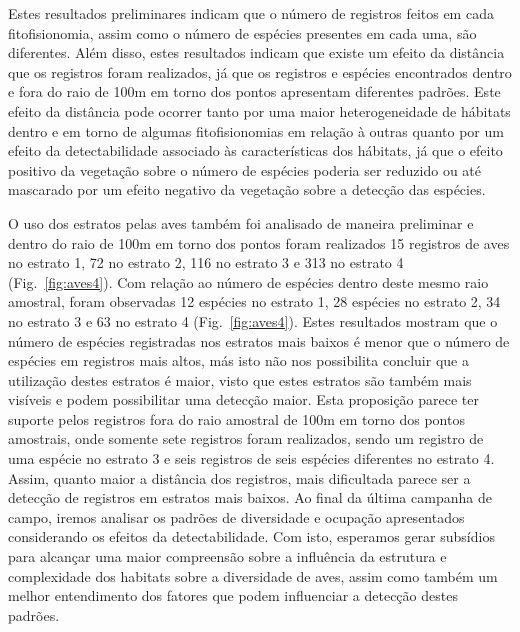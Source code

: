 Estes resultados preliminares indicam que o número de registros feitos
em cada fitofisionomia, assim como o número de espécies presentes em
cada uma, são diferentes. Além disso, estes resultados indicam que
existe um efeito da distância que os registros foram realizados, já
que os registros e espécies encontrados dentro e fora do raio de 100m
em torno dos pontos apresentam diferentes padrões. Este efeito da
distância pode ocorrer tanto por uma maior heterogeneidade de hábitats
dentro e em torno de algumas fitofisionomias em relação à outras quanto por um
efeito da detectabilidade associado às características dos hábitats,
já que o efeito positivo da vegetação sobre o número de espécies
poderia ser reduzido ou até mascarado por um efeito negativo da
vegetação sobre a detecção das espécies.

O uso dos estratos pelas aves também foi analisado de maneira
preliminar e dentro do raio de 100m em torno dos pontos foram
realizados 15 registros de aves no estrato 1, 72 no estrato 2, 116 no
estrato 3 e 313 no estrato 4 (Fig.~\ref{fig:aves4}). Com relação ao número de
espécies dentro deste mesmo raio amostral, foram observadas 12
espécies no estrato 1, 28 espécies no estrato 2, 34 no estrato 3 e 63
no estrato 4 (Fig.~\ref{fig:aves4}). Estes resultados mostram que o número de
espécies registradas nos estratos mais baixos é menor que o número de
espécies em registros mais altos, más isto não nos possibilita
concluir que a utilização destes estratos é maior, visto que estes
estratos são também mais visíveis e podem possibilitar uma detecção
maior. Esta proposição parece ter suporte pelos registros fora do raio
amostral de 100m em torno dos pontos amostrais, onde somente sete
registros foram realizados, sendo um registro de uma espécie no
estrato 3 e seis registros de seis espécies diferentes no estrato
4. Assim, quanto maior a distância dos registros, mais dificultada
parece ser a detecção de registros em estratos mais baixos. Ao final
da última campanha de campo, iremos analisar os padrões de diversidade
e ocupação apresentados considerando os efeitos da
detectabilidade. Com isto, esperamos gerar subsídios para alcançar uma
maior compreensão sobre a influência da estrutura e complexidade dos
habitats sobre a diversidade de aves, assim como também um melhor
entendimento dos fatores que podem influenciar a detecção destes
padrões.